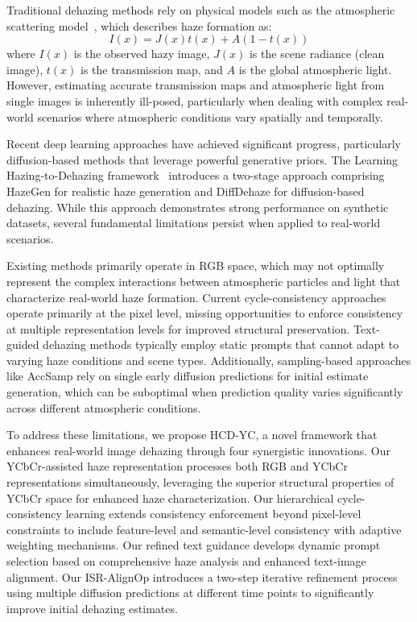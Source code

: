 \documentclass{article}
\begin{document}
Traditional dehazing methods rely on physical models such as the atmospheric scattering model~\cite{mccartney1976optics}, which describes haze formation as:
\begin{equation}
I(x) = J(x)t(x) + A(1-t(x))
\end{equation}
where $I(x)$ is the observed hazy image, $J(x)$ is the scene radiance (clean image), $t(x)$ is the transmission map, and $A$ is the global atmospheric light. However, estimating accurate transmission maps and atmospheric light from single images is inherently ill-posed, particularly when dealing with complex real-world scenarios where atmospheric conditions vary spatially and temporally.

Recent deep learning approaches have achieved significant progress, particularly diffusion-based methods that leverage powerful generative priors. The Learning Hazing-to-Dehazing framework~\cite{wang2025learning} introduces a two-stage approach comprising HazeGen for realistic haze generation and DiffDehaze for diffusion-based dehazing. While this approach demonstrates strong performance on synthetic datasets, several fundamental limitations persist when applied to real-world scenarios.

Existing methods primarily operate in RGB space, which may not optimally represent the complex interactions between atmospheric particles and light that characterize real-world haze formation. Current cycle-consistency approaches operate primarily at the pixel level, missing opportunities to enforce consistency at multiple representation levels for improved structural preservation. Text-guided dehazing methods typically employ static prompts that cannot adapt to varying haze conditions and scene types. Additionally, sampling-based approaches like AccSamp rely on single early diffusion predictions for initial estimate generation, which can be suboptimal when prediction quality varies significantly across different atmospheric conditions.

To address these limitations, we propose HCD-YC, a novel framework that enhances real-world image dehazing through four synergistic innovations. Our YCbCr-assisted haze representation processes both RGB and YCbCr representations simultaneously, leveraging the superior structural properties of YCbCr space for enhanced haze characterization. Our hierarchical cycle-consistency learning extends consistency enforcement beyond pixel-level constraints to include feature-level and semantic-level consistency with adaptive weighting mechanisms. Our refined text guidance develops dynamic prompt selection based on comprehensive haze analysis and enhanced text-image alignment. Our ISR-AlignOp introduces a two-step iterative refinement process using multiple diffusion predictions at different time points to significantly improve initial dehazing estimates.
\end{document}
